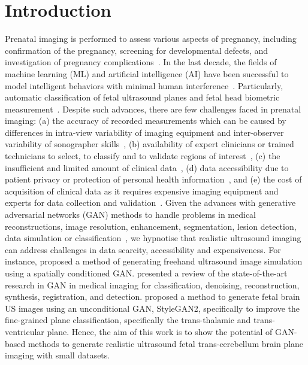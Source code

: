 \documentclass{midl} %
\begin{document}
\section{Introduction}
Prenatal imaging is performed to assess various aspects of pregnancy, including confirmation of the pregnancy, screening for developmental defects, and investigation of pregnancy complications~\citep{Kline-Fath2007}.
In the last decade, the fields of machine learning (ML) and artificial intelligence (AI) have been successful to model intelligent behaviors with minimal human interference~\citep{Hamet2017}.
Particularly, automatic classification of fetal ultrasound planes and fetal head biometric measurement~\citep{Burgos-Artizzu2020-1, Sinclair2018, fiorentino2022_arxiv}.
Despite such advances, there are few challenges faced in prenatal imaging:
(a) the accuracy of recorded measurements which can be caused by differences in intra-view variability of imaging equipment and inter-observer variability of sonographer skills~\citep{NHS2015, Sarris2012, Villar1989, Kesmodel2018},
(b) availability of expert clinicians or trained technicians to select, to classify and to validate regions of interest~\citep{Burgos-Artizzu2020},
(c) the insufficient and limited amount of clinical data~\citep{Jang2018, Sinclair2018, He2021}, 
(d) data accessibility due to patient privacy or protection of personal health information~\citep{Shin2018}, and 
(e) the cost of acquisition of clinical data
as it requires expensive imaging equipment and experts for data collection and validation~\citep{Wang2019, Kim2019}.
Given the advances with generative adversarial networks (GAN) methods to handle problems in medical reconstructions, image resolution, enhancement, segmentation, lesion detection, data simulation or classification~\citep{2022_AlAmir_GANMedicalSurvey}, we hypnotise that realistic ultrasound imaging can address challenges in data scarcity, accessibility and expensiveness.
For instance, 
\citet{Hu2017} proposed a method of generating freehand ultrasound image simulation using a spatially conditioned GAN.
\citet{Kazeminia2020} presented a review of the state-of-the-art research in GAN in medical imaging for classification, denoising, reconstruction, synthesis, registration, and detection.
\citet{Montero2021} proposed a method to generate fetal brain US images using an unconditional GAN, StyleGAN2, specifically to improve the fine-grained plane classification, specifically the trans-thalamic and trans-ventricular plane.
Hence, the aim of this work is to show the potential of GAN-based methods to generate realistic ultrasound fetal trans-cerebellum brain plane imaging with small datasets.
\end{document}
